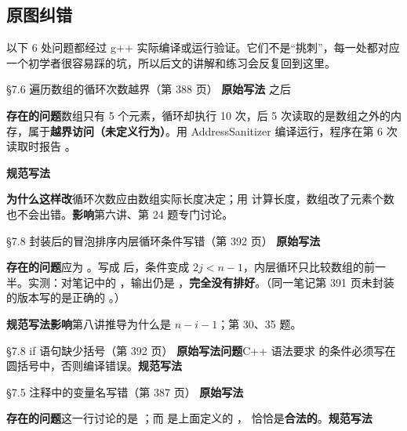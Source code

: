 \subsection*{原图纠错}
以下 6 处问题都经过 g++ 实际编译或运行验证。它们不是“挑刺”，每一处都对应一个初学者很容易踩的坑，所以后文的讲解和练习会反复回到这里。

\begin{correctionbox}{ §7.6 遍历数组的循环次数越界（第 388 页）}
\textbf{原始写法}\quad {} 之后 

\textbf{存在的问题}\quad 数组只有 5 个元素，循环却执行 10 次，后 5 次读取的是数组之外的内存，属于\textbf{越界访问（未定义行为）}。用 AddressSanitizer 编译运行，程序在第 6 次读取时报告 。

\textbf{规范写法}\quad {}\ \ 

\textbf{为什么这样改}\quad 循环次数应由数组实际长度决定；用  计算长度，数组改了元素个数也不会出错。\quad\textbf{影响}\quad 第六讲、第 24 题专门讨论。
\end{correctionbox}

\begin{correctionbox}{ §7.8 封装后的冒泡排序内层循环条件写错（第 392 页）}
\textbf{原始写法}\quad {}

\textbf{存在的问题}\quad 应为 。写成  后，条件变成 $2j<n-1$，内层循环只比较数组的前一半。实测：对笔记中的 ，输出仍是 ，\textbf{完全没有排好}。（同一笔记第 391 页未封装的版本写的是正确的 。）

\textbf{规范写法}\quad {}\qquad\textbf{影响}\quad 第八讲推导为什么是 $n-i-1$；第 30、35 题。
\end{correctionbox}

\begin{correctionbox}{ §7.8 if 语句缺少括号（第 392 页）}
\textbf{原始写法}\quad {}\qquad \textbf{问题}\quad C++ 语法要求  的条件必须写在圆括号中，否则编译错误。\qquad\textbf{规范写法}\quad {}
\end{correctionbox}

\begin{correctionbox}{ §7.5 注释中的变量名写错（第 387 页）}
\textbf{原始写法}\quad {}\ \ 

\textbf{存在的问题}\quad 这一行讨论的是 ；而  是上面定义的 ， 恰恰是\textbf{合法的}。\quad\textbf{规范写法}\quad {}
\end{correctionbox}

